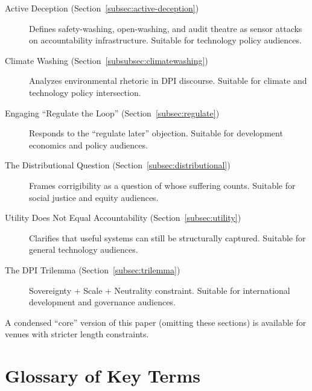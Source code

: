 \documentclass{article}
\begin{document}
\begin{description}
\item[Active Deception (Section~\ref{subsec:active-deception})] Defines safety-washing, open-washing, and audit theatre as sensor attacks on accountability infrastructure. Suitable for technology policy audiences.

\item[Climate Washing (Section~\ref{subsubsec:climatewashing})] Analyzes environmental rhetoric in DPI discourse. Suitable for climate and technology policy intersection.

\item[Engaging ``Regulate the Loop'' (Section~\ref{subsec:regulate})] Responds to the ``regulate later'' objection. Suitable for development economics and policy audiences.

\item[The Distributional Question (Section~\ref{subsec:distributional})] Frames corrigibility as a question of whose suffering counts. Suitable for social justice and equity audiences.

\item[Utility Does Not Equal Accountability (Section~\ref{subsec:utility})] Clarifies that useful systems can still be structurally captured. Suitable for general technology audiences.

\item[The DPI Trilemma (Section~\ref{subsec:trilemma})] Sovereignty + Scale + Neutrality constraint. Suitable for international development and governance audiences.
\end{description}

A condensed ``core'' version of this paper (omitting these sections) is available for venues with stricter length constraints.

\section{Glossary of Key Terms}
\label{appendix:glossary}
\end{document}
